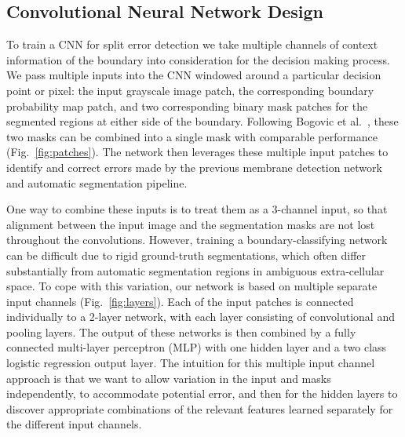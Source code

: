 \subsection{Convolutional Neural Network Design}
To train a CNN for split error detection we take multiple channels of context information of the boundary into consideration for the decision making process. We pass multiple inputs into the CNN windowed around a particular decision point or pixel: the input grayscale image patch, the corresponding boundary probability map patch, and two corresponding binary mask patches for the segmented regions at either side of the boundary. Following Bogovic et al.~\cite{BogovicHJ13}, these two masks can be combined into a single mask with comparable performance (Fig.~\ref{fig:patches}). The network then leverages these multiple input patches to identify and correct errors made by the previous membrane detection network and automatic segmentation pipeline.

One way to combine these inputs is to treat them as a 3-channel input, so that alignment between the input image and the segmentation masks are not lost throughout the convolutions. However, training a boundary-classifying network can be difficult due to rigid ground-truth segmentations, which often differ substantially from automatic segmentation regions in ambiguous extra-cellular space. To cope with this variation, our network is based on multiple separate input channels (Fig.~\ref{fig:layers}). Each of the input patches is connected individually to a 2-layer network, with each layer consisting of convolutional and pooling layers. The output of these networks is then combined by a fully connected multi-layer perceptron (MLP) with one hidden layer and a two class logistic regression output layer. The intuition for this multiple input channel approach is that we want to allow variation in the input and masks independently, to accommodate potential error, and then for the hidden layers to discover appropriate combinations of the relevant features learned separately for the different input channels.


